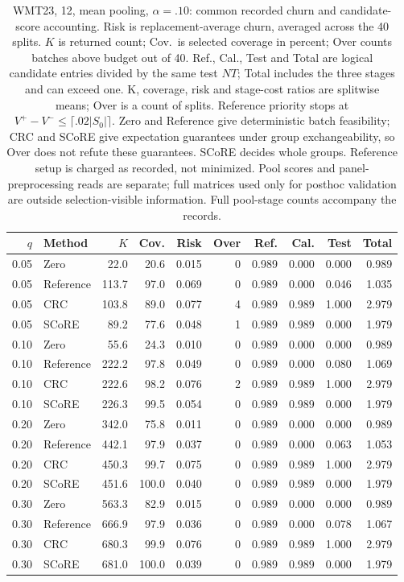 \begin{table}[t]
\centering\small
\setlength{\tabcolsep}{4pt}
\begin{tabular}{rlrrrrrrrr}
\toprule
$q$ & Method & $K$ & Cov. & Risk & Over & Ref. & Cal. & Test & Total \\
\midrule
0.05 & Zero & 22.0 & 20.6 & 0.015 & 0 & 0.989 & 0.000 & 0.000 & 0.989 \\
0.05 & Reference & 113.7 & 97.0 & 0.069 & 0 & 0.989 & 0.000 & 0.046 & 1.035 \\
0.05 & CRC & 103.8 & 89.0 & 0.077 & 4 & 0.989 & 0.989 & 1.000 & 2.979 \\
0.05 & SCoRE & 89.2 & 77.6 & 0.048 & 1 & 0.989 & 0.989 & 0.000 & 1.979 \\
0.10 & Zero & 55.6 & 24.3 & 0.010 & 0 & 0.989 & 0.000 & 0.000 & 0.989 \\
0.10 & Reference & 222.2 & 97.8 & 0.049 & 0 & 0.989 & 0.000 & 0.080 & 1.069 \\
0.10 & CRC & 222.6 & 98.2 & 0.076 & 2 & 0.989 & 0.989 & 1.000 & 2.979 \\
0.10 & SCoRE & 226.3 & 99.5 & 0.054 & 0 & 0.989 & 0.989 & 0.000 & 1.979 \\
0.20 & Zero & 342.0 & 75.8 & 0.011 & 0 & 0.989 & 0.000 & 0.000 & 0.989 \\
0.20 & Reference & 442.1 & 97.9 & 0.037 & 0 & 0.989 & 0.000 & 0.063 & 1.053 \\
0.20 & CRC & 450.3 & 99.7 & 0.075 & 0 & 0.989 & 0.989 & 1.000 & 2.979 \\
0.20 & SCoRE & 451.6 & 100.0 & 0.040 & 0 & 0.989 & 0.989 & 0.000 & 1.979 \\
0.30 & Zero & 563.3 & 82.9 & 0.015 & 0 & 0.989 & 0.000 & 0.000 & 0.989 \\
0.30 & Reference & 666.9 & 97.9 & 0.036 & 0 & 0.989 & 0.000 & 0.078 & 1.067 \\
0.30 & CRC & 680.3 & 99.9 & 0.076 & 0 & 0.989 & 0.989 & 1.000 & 2.979 \\
0.30 & SCoRE & 681.0 & 100.0 & 0.039 & 0 & 0.989 & 0.989 & 0.000 & 1.979 \\
\bottomrule
\end{tabular}
\caption{WMT23, 12, mean pooling, $\alpha=.10$: common recorded churn and candidate-score accounting. Risk is replacement-average churn, averaged across the 40 splits. $K$ is returned count; Cov.\ is selected coverage in percent; Over counts batches above budget out of 40. Ref., Cal., Test and Total are logical candidate entries divided by the same test $NT$; Total includes the three stages and can exceed one. K, coverage, risk and stage-cost ratios are splitwise means; Over is a count of splits. Reference priority stops at $V^+-V^-\le\lceil.02|S_0|\rceil$. Zero and Reference give deterministic batch feasibility; CRC and SCoRE give expectation guarantees under group exchangeability, so Over does not refute these guarantees. SCoRE decides whole groups. Reference setup is charged as recorded, not minimized. Pool scores and panel-preprocessing reads are separate; full matrices used only for posthoc validation are outside selection-visible information. Full pool-stage counts accompany the records.}
\label{tab:common-WMT23-without-synthetic-ref-mean}
\end{table}
